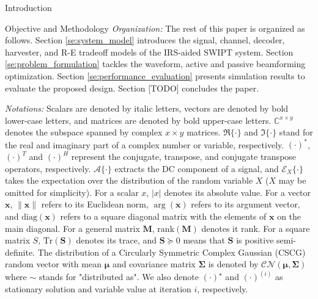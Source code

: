 \documentclass[journal]{IEEEtran}
\begin{document}
\begin{section}{Introduction}
\begin{subsection}{Objective and Methodology}
			\textit{Organization:} The rest of this paper is organized as follows. Section \ref{se:system_model} introduces the signal, channel, decoder, harvester, and R-E tradeoff models of the IRS-aided SWIPT system. Section \ref{se:problem_formulation} tackles the waveform, active and passive beamforming optimization. Section \ref{se:performance_evaluation} presents simulation results to evaluate the proposed design. Section [TODO] concludes the paper.

			\textit{Notations:} Scalars are denoted by italic letters, vectors are denoted by bold lower-case letters, and matrices are denoted by bold upper-case letters. $\mathbb{C}^{x \times y}$ denotes the subspace spanned by complex $x \times y$ matrices. $\Re\{\cdot\}$ and $\Im\{\cdot\}$ stand for the real and imaginary part of a complex number or variable, respectively. $(\cdot)^*$, $(\cdot)^T$ and $(\cdot)^H$ represent the conjugate, transpose, and conjugate transpose operators, respectively. $\mathcal{A}\{\cdot\}$ extracts the DC component of a signal, and $\mathcal{E}_X\{\cdot\}$ takes the expectation over the distribution of the random variable $X$ ($X$ may be omitted for simplicity). For a scalar $x$, $\lvert{x}\rvert$ denotes its absolute value. For a vector $\boldsymbol{x}$, $\lVert{\boldsymbol{x}}\rVert$ refers to its Euclidean norm, $\arg(\boldsymbol{x})$ refers to its argument vector, and $\mathrm{diag}(\boldsymbol{x})$ refers to a square diagonal matrix with the elements of $\boldsymbol{x}$ on the main diagonal. For a general matrix $\boldsymbol{M}$, $\mathrm{rank}(\boldsymbol{M})$ denotes it rank. For a square matrix $S$, $\mathrm{Tr}(\boldsymbol{S})$ denotes its trace, and $\boldsymbol{S} \succeq 0$ means that $\boldsymbol{S}$ is positive semi-definite. The distribution of a Circularly Symmetric Complex Gaussian (CSCG) random vector with mean $\boldsymbol{\mu}$ and covariance matrix $\boldsymbol{\Sigma}$ is denoted by $\mathcal{CN}(\boldsymbol{\mu},\boldsymbol{\Sigma})$ where $\sim$ stands for "distributed as". We also denote $(\cdot)^{\star}$ and $(\cdot)^{(i)}$ as stationary solution and variable value at iteration $i$, respectively.
		\end{subsection}
	\end{section}
\end{document}
